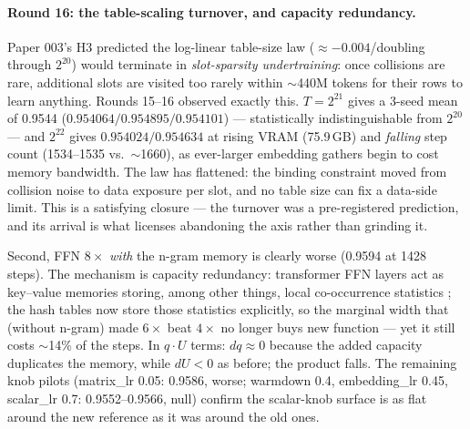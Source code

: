 \documentclass{article}
\begin{document}
\paragraph{Round 16: the table-scaling turnover, and capacity redundancy.}
Paper 003's H3 predicted the log-linear table-size law ($\approx -0.004$/doubling through $2^{20}$) would terminate in \emph{slot-sparsity undertraining}: once collisions are rare, additional slots are visited too rarely within $\sim$440M tokens for their rows to learn anything. Rounds 15--16 observed exactly this. $T = 2^{21}$ gives a 3-seed mean of 0.9544 ($0.954064/0.954895/0.954101$) --- statistically indistinguishable from $2^{20}$ --- and $2^{22}$ gives $0.954024/0.954634$ at rising VRAM (75.9\,GB) and \emph{falling} step count (1534--1535 vs.\ $\sim$1660), as ever-larger embedding gathers begin to cost memory bandwidth. The law has flattened: the binding constraint moved from collision noise to data exposure per slot, and no table size can fix a data-side limit. This is a satisfying closure --- the turnover was a pre-registered prediction, and its arrival is what licenses abandoning the axis rather than grinding it.

Second, FFN $8\times$ \emph{with} the n-gram memory is clearly worse (0.9594 at 1428 steps). The mechanism is capacity redundancy: transformer FFN layers act as key--value memories storing, among other things, local co-occurrence statistics \cite{geva2021kv}; the hash tables now store those statistics explicitly, so the marginal width that (without n-gram) made $6\times$ beat $4\times$ no longer buys new function --- yet it still costs $\sim$14\% of the steps. In $q \cdot U$ terms: $dq \approx 0$ because the added capacity duplicates the memory, while $dU < 0$ as before; the product falls. The remaining knob pilots (matrix\_lr 0.05: 0.9586, worse; warmdown 0.4, embedding\_lr 0.45, scalar\_lr 0.7: 0.9552--0.9566, null) confirm the scalar-knob surface is as flat around the new reference as it was around the old ones.
\end{document}
